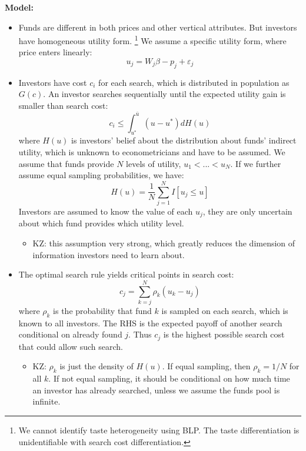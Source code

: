 \documentclass{book}
\theoremstyle{plain}
\theoremstyle{definition}
\begin{document}
\vspace{1em}
\noindent
\textbf{Model:}
\begin{itemize}
	\item Funds are different in both prices and other vertical attributes. But investors have homogeneous utility form. 
	\footnote{We cannot identify taste heterogeneity using BLP. The taste differentiation is unidentifiable with search cost differentiation.}
	We assume a specific utility form, where price enters linearly:
	\[u_j=W_j \beta-p_j+\varepsilon_j\]
	\item Investors have cost $c_i$ for each search, which is distributed in population as $G(c)$. An investor searches sequentially until the expected utility gain is smaller than search cost:
	\[c_i \leq \int_{u^*}^{\bar u} (u-u^*)dH(u)\]
	where $H(u)$ is investors' belief about the distribution about funds' indirect utility, which is unknown to econometricians and have to be assumed. We assume that funds provide $N$ levels of utility, $u_1 < ... <u_N$. If we further assume equal sampling probabilities, we have:
	\[H(u)=\frac{1}{N}\sum_{j=1}^N I[u_j \leq u]\]
	Investors are assumed to know the value of each $u_j$, they are only uncertain about which fund provides which utility level.
	\begin{itemize}
		\item KZ: this assumption very strong, which greatly reduces the dimension of information investors need to learn about.
	\end{itemize}
	\item The optimal search rule yields critical points in search cost:
	\[c_j=\sum_{k=j}^N{\rho_k (u_k-u_j)}\]
	where $\rho_k$ is the probability that fund $k$ is sampled on each search, which is known to all investors. The RHS is the expected payoff of another search conditional on already found $j$. Thus $c_j$ is the highest possible search cost that could allow such search.
	\begin{itemize}
		\item KZ: $\rho_k$ is just the density of $H(u)$. If equal sampling, then $\rho_k=1/N$ for all $k$. If not equal sampling, it should be conditional on how much time an investor has already searched, unless we assume the funds pool is infinite. 
	\end{itemize}
\end{itemize}
\end{document}

